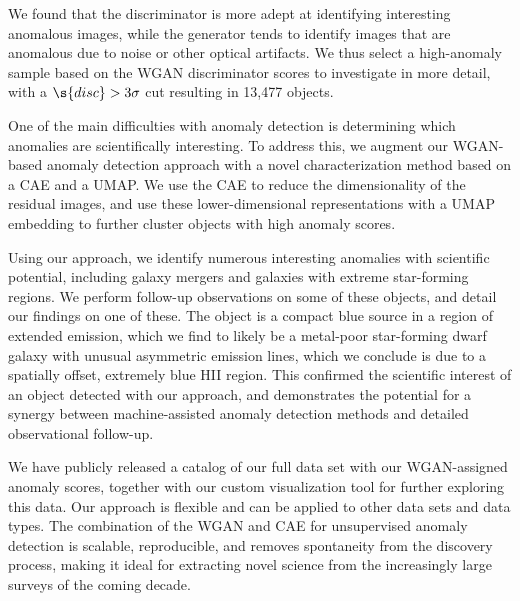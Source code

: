 We found that the discriminator is more adept at identifying interesting anomalous images, while the generator tends to identify images that are anomalous due to noise or other optical artifacts.
We thus select a high-anomaly sample based on the WGAN discriminator scores to investigate in more detail, with a $\s{disc}>3\sigma$ cut resulting in 13,477 objects. 

One of the main difficulties with anomaly detection is determining which anomalies are scientifically interesting.
To address this, we augment our WGAN-based anomaly detection approach with a novel characterization method based on a CAE and a UMAP.
We use the CAE to reduce the dimensionality of the residual images, and use these lower-dimensional representations with a UMAP embedding to further cluster objects with high anomaly scores.

Using our approach, we identify numerous interesting anomalies with scientific potential, including galaxy mergers and galaxies with extreme star-forming regions.
We perform follow-up observations on some of these objects, and detail our findings on one of these.
The object is a compact blue source in a region of extended emission, which we find to likely be a metal-poor star-forming dwarf galaxy with unusual asymmetric emission lines, which we conclude is due to a spatially offset, extremely blue HII region.
This confirmed the scientific interest of an object detected with our approach, and demonstrates the potential for a synergy between machine-assisted anomaly detection methods and detailed observational follow-up.

We have publicly released a catalog of our full data set with our WGAN-assigned anomaly scores, together with our custom visualization tool for further exploring this data.
Our approach is flexible and can be applied to other data sets and data types.
The combination of the WGAN and CAE for unsupervised anomaly detection is scalable, reproducible, and removes spontaneity from the discovery process, making it ideal for extracting novel science from the increasingly large surveys of the coming decade.

